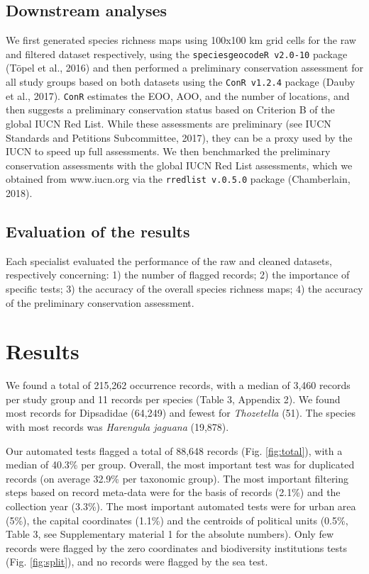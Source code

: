 \documentclass[
  12pt,
]{article}
\begin{document}
\hypertarget{downstream-analyses}{%
\subsection{Downstream analyses}\label{downstream-analyses}}

We first generated species richness maps using 100x100 km grid cells for the raw and filtered dataset respectively, using the \texttt{speciesgeocodeR\ v2.0-10} package (Töpel et al., 2016) and then performed a preliminary conservation assessment for all study groups based on both datasets using the \texttt{ConR\ v1.2.4} package (Dauby et al., 2017). \texttt{ConR} estimates the EOO, AOO, and the number of locations, and then suggests a preliminary conservation status based on Criterion B of the global IUCN Red List. While these assessments are preliminary (see IUCN Standards and Petitions Subcommittee, 2017), they can be a proxy used by the IUCN to speed up full assessments. We then benchmarked the preliminary conservation assessments with the global IUCN Red List assessments, which we obtained from www.iucn.org via the \texttt{rredlist\ v.0.5.0} package (Chamberlain, 2018).

\hypertarget{evaluation-of-the-results}{%
\subsection{Evaluation of the results}\label{evaluation-of-the-results}}

Each specialist evaluated the performance of the raw and cleaned datasets, respectively concerning: 1) the number of flagged records; 2) the importance of specific tests; 3) the accuracy of the overall species richness maps; 4) the accuracy of the preliminary conservation assessment.

\hypertarget{results}{%
\section{Results}\label{results}}

We found a total of 215,262 occurrence records, with a median of 3,460 records per study group and 11 records per species (Table 3, Appendix 2). We found most records for Dipsadidae (64,249) and fewest for \emph{Thozetella} (51). The species with most records was \emph{Harengula jaguana} (19,878).

Our automated tests flagged a total of 88,648 records (Fig. \ref{fig:total}), with a median of 40.3\% per group. Overall, the most important test was for duplicated records (on average 32.9\% per taxonomic group). The most important filtering steps based on record meta-data were for the basis of records (2.1\%) and the collection year (3.3\%). The most important automated tests were for urban area (5\%), the capital coordinates (1.1\%) and the centroids of political units (0.5\%, Table 3, see Supplementary material 1 for the absolute numbers). Only few records were flagged by the zero coordinates and biodiversity institutions tests (Fig. \ref{fig:split}), and no records were flagged by the sea test.
\end{document}
